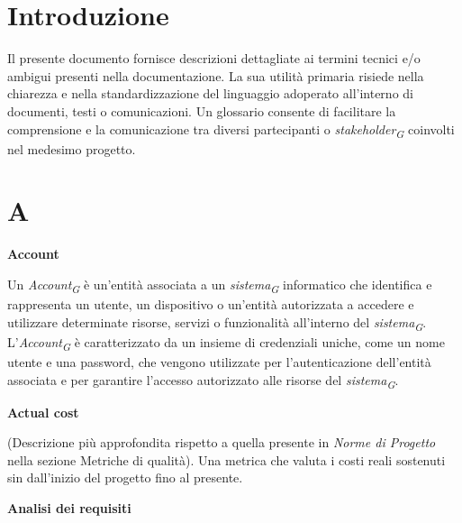 \documentclass{article}
\begin{document}
\section*{Introduzione}
Il presente documento fornisce descrizioni dettagliate ai termini tecnici e/o ambigui presenti nella documentazione.
La sua utilità primaria risiede nella chiarezza e nella standardizzazione del linguaggio adoperato all'interno di documenti, testi o comunicazioni. Un glossario consente di facilitare la comprensione e la comunicazione tra diversi partecipanti o \textit{stakeholder}\textsubscript{\textit{G}} coinvolti nel medesimo progetto.

\section*{A}
{}

\vspace{0.4cm}

\textbf{Account}

\vspace{0.1cm}

Un \textit{Account}\textsubscript{\textit{G}} è un'entità associata a un \textit{sistema}\textsubscript{\textit{G}} informatico che identifica e rappresenta un utente, un dispositivo o un'entità autorizzata a accedere e utilizzare determinate risorse, servizi o funzionalità all'interno del \textit{sistema}\textsubscript{\textit{G}}. L'\textit{Account}\textsubscript{\textit{G}} è caratterizzato da un insieme di credenziali uniche, come un nome utente e una password, che vengono utilizzate per l'autenticazione dell'entità associata e per garantire l'accesso autorizzato alle risorse del \textit{sistema}\textsubscript{\textit{G}}.

\vspace{0.4cm}

\textbf{Actual cost}

\vspace{0.1cm}

(Descrizione più approfondita rispetto a quella presente in \textit{Norme di Progetto} nella sezione Metriche di qualità). Una metrica che valuta i costi reali sostenuti sin dall'inizio del progetto fino al presente.

\vspace{0.4cm}

\textbf{Analisi dei requisiti}
\end{document}
